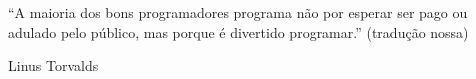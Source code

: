 
\begin{epigrafe}
    \vspace*{\fill}
   \hspace{.45\textwidth}
   \begin{minipage}{.5\textwidth}
      \SingleSpacing



{\small``A maioria dos bons programadores programa
não por esperar ser pago ou adulado pelo público,
mas porque é divertido programar.''  (tradução nossa)

\vspace{\onelineskip}

Linus Torvalds}
   \end{minipage}
	\vspace*{\fill}
\end{epigrafe}
